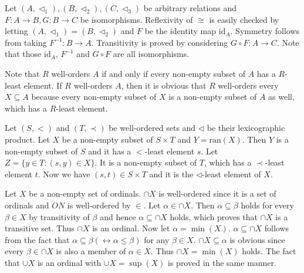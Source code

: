 \documentclass[12pt]{article}
\theoremstyle{definition}
\newenvironment{customthm}[1]
  {\renewcommand\theinnercustomthm{#1}\innercustomthm}
  {\endinnercustomthm}
\begin{document}
\begin{customthm}{I.7.17} Let $(A,\triangleleft_1),(B,\triangleleft_2),(C,\triangleleft_3)$ be arbitrary relations and $F:A\rightarrow B,G:B\rightarrow C$ be isomorphisms. Reflexivity of $\cong$ is easily checked by letting $(A,\triangleleft_1)=(B,\triangleleft_2)$ and $F$ be the identity map $\mathrm{id}_A$. Symmetry follows from taking $F^{-1}:B\rightarrow A$. Transitivity is proved by considering $G\circ F:A\rightarrow C$.
Note that those $\mathrm{id}_A$, $F^{-1}$ and $G\circ F$ are all isomorphisms.
\end{customthm}

\begin{customthm}{I.7.21} Note that $R$ well-orders $A$ if and only if every non-empty subset of $A$ has a $R$-least element. If $R$ well-orders $A$, then it is obvious that $R$ well-orders every $X\subseteq A$ because every non-empty subset of $X$ is a non-empty subset of $A$ as well, which has a $R$-least element.
\end{customthm}

\begin{customthm}{I.7.23} Let $(S,<)$ and $(T,\prec)$ be well-ordered sets and $\triangleleft$ be their lexicographic product. Let $X$ be a non-empty subset of $S\times T$ and $Y = \mathrm{ran}(X)$. Then $Y$ is a non-empty subset of $S$ and it has a $<$-least element $s$. Let $Z=\{y\in T:(s,y)\in X\}$. It is a non-empty subset of $T$, which has a $\prec$-least element $t$. Now we have $(s,t)\in S\times T$ and it is the $\triangleleft$-least element of $X$.
\end{customthm}

\begin{customthm}{I.8.10} Let $X$ be a non-empty set of ordinals. $\cap X$ is well-ordered since it is a set of ordinals and $ON$ is well-ordered by $\in$. Let $\alpha\in\cap X$. Then $\alpha\subseteq\beta$ holds for every $\beta\in X$ by transitivity of $\beta$ and hence $\alpha\subseteq\cap X$ holds, which proves that $\cap X$ is a transitive set. Thus $\cap X$ is an ordinal.
Now let $\alpha=\min(X)$. $\alpha\subseteq\cap X$ follows from the fact that $\alpha\subseteq\beta(\leftrightarrow\alpha\leq\beta)$ for any $\beta\in X$. $\cap X\subseteq\alpha$ is obvious since every $\beta\in\cap X$ is also a member of $\alpha\in X$. Thus $\cap X=\min(X)$ holds. The fact that $\cup X$ is an ordinal with $\cup X=\sup(X)$ is proved in the same manner.
\end{customthm}
\end{document}
